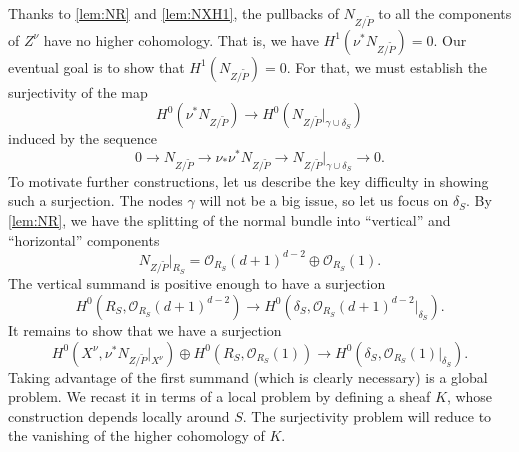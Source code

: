 \documentclass[11 pt]{amsart}
\renewcommand{\O}{{\mathcal O}}
\numberwithin{equation}{section}
\begin{document}
Thanks to \autoref{lem:NR} and \autoref{lem:NXH1}, the pullbacks of $N_{Z / \widetilde{P}}$ to all the components of $Z^\nu$ have no higher cohomology.
That is, we have $H^1(\nu^* N_{Z/\widetilde{P}}) = 0$.
Our eventual goal is to show that $H^1(N_{Z / \widetilde{P}}) = 0$.
For that, we must establish the surjectivity of the map
\[ H^0(\nu^*N_{Z/\widetilde{P}}) \to H^0\left(N_{Z/\widetilde{P}}\big|_{\gamma \cup \delta_S}\right)\]
induced by the sequence
\[0 \to N_{Z /\widetilde{P}} \to \nu_*\nu^* N_{Z/\widetilde{P}} \to N_{Z /\widetilde{P}}\big |_{\gamma \cup \delta_S} \to 0.\]
To motivate further constructions, let us describe the key difficulty in showing such a surjection.
The nodes $\gamma$ will not be a big issue, so let us focus on $\delta_S$.
By \autoref{lem:NR},  we have the splitting of the normal bundle into ``vertical'' and ``horizontal'' components
\[N_{Z/\widetilde{P}}\big|_{R_S} = \O_{R_S}(d+1)^{d-2} \oplus \O_{R_S}(1).\]
The vertical summand is positive enough to have a surjection
\[ H^0\left(R_S, \O_{R_S}(d+1)^{d-2}\right) \to H^0\left(\delta_S, \O_{R_S}(d+1)^{d-2}\big|_{\delta_S}\right).\]
It remains to show that we have a surjection
\[ H^0\left(X^\nu, \nu^* N_{Z/\widetilde{P}}\big|_{X^\nu}\right)  \oplus H^0(R_S, \O_{R_S}(1)) \to H^0\left(\delta_S, \O_{R_S}(1) \big|_{\delta_S}\right).\]
Taking advantage of the first summand (which is clearly necessary) is a global problem.
We recast it in terms of a local problem by defining a sheaf $K$, whose construction depends locally around $S$.
The surjectivity problem will reduce to the vanishing of the higher cohomology of $K$.
\end{document}
